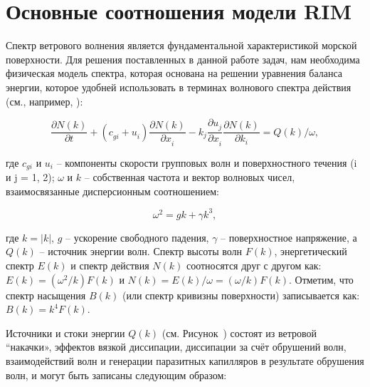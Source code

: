 \appendix



\chapter{Основные соотношения модели RIM} \label{AppendixA}






Спектр ветрового волнения является фундаментальной характеристикой морской поверхности. Для решения поставленных в данной работе задач, нам необходима физическая модель спектра, которая основана на решении уравнения баланса энергии, которое удобней использовать в терминах волнового спектра действия (см., например, \citep{Phillips1977}):



\begin{equation} \label{1.29)} \frac{\partial N(k)}{\partial t} +\left(c_{gi}^{} +u_{i}^{} \right)\frac{\partial N(k)}{\partial x_{i}^{} } -k_{j}^{} \frac{\partial u_{j}^{} }{\partial x_{i}^{} } \frac{\partial N(k)}{\partial k_{i}^{} } =Q(k)/\omega , \end{equation} 



\noindent где $c_{gi} $ и $u_{i} $ -- компоненты скорости групповых волн и поверхностного течения (i и j = 1, 2); $\omega $ и $k$ -- собственная частота и вектор волновых чисел, взаимосвязанные дисперсионным соотношением:



\begin{equation} \label{1.30)} \omega _{}^{2} =gk+\gamma k_{}^{3} , \end{equation} 



\noindent где $k=|k|$, $g$ -- ускорение свободного падения, $\gamma $ -- поверхностное напряжение, а $Q(k)$ -- источник энергии волн. Спектр высоты волн $F(k)$, энергетический спектр $E(k)$ и спектр действия $N(k)$ соотносятся друг с другом как: $E(k)=(\omega ^{2} /k)F(k)$ и $N(k)=E(k)/\omega =(\omega /k)F(k)$. Отметим, что спектр насыщения $B(k)$ (или спектр кривизны поверхности) записывается как: $B(k)=k^{4} F(k)$.

Источники и стоки энергии $Q(k)$ (см. Рисунок~) состоят из ветровой ``накачки», эффектов вязкой диссипации, диссипации за счёт обрушений волн, взаимодействий волн и генерации паразитных капилляров в результате обрушения волн, и могут быть записаны следующим образом:



